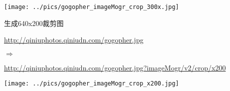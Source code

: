 \documentclass[11pt, oneside]{book}
\newcommand{\qpar}[1]{
\vspace{0.25em}
\noindent
#1\par
\vspace{0.25em}
}
\newcommand{\qurl}[1]{\url{#1}}
\begin{document}
\begin{CJK*}{UTF8}{song}
\begin{sample}
    \begin{center}
      \texttt{[image: ../pics/gogopher\_imageMogr\_crop\_300x.jpg]}
    \end{center}
  \label{imageMogr-crop-300x}
\end{sample}

\begin{sample}
  \caption{生成640x200裁剪图}
    \qpar{\qurl{http://qiniuphotos.qiniudn.com/gogopher.jpg}}
    \qpar{$\Rightarrow$}
    \qpar{\qurl{http://qiniuphotos.qiniudn.com/gogopher.jpg?imageMogr/v2/crop/x200}}

    \begin{center}
      \texttt{[image: ../pics/gogopher\_imageMogr\_crop\_x200.jpg]}
    \end{center}
  \label{imageMogr-crop-x200}
\end{sample}

\end{CJK*}
\end{document}
